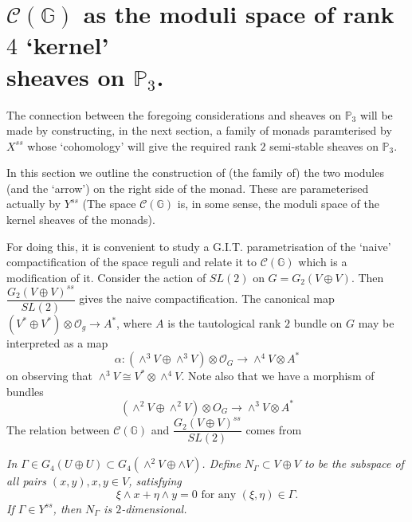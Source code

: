 \section[\texorpdfstring{$\mathscr{C}(\mathbb{G})$}{eq} as the moduli...]{\texorpdfstring{$\mathscr{C}(\mathbb{G})$}{eq} as the moduli space of rank \texorpdfstring{$4$}{eq}
  `kernel'\\ sheaves on \texorpdfstring{$\mathbb{P}_3$}{eq}.}\label{s6}

The connection between the foregoing considerations and sheaves\pageoriginale
 on
$\mathbb{P}_3$ will be made by constructing, in the next section, a family of monads paramterised by $X^{ss}$ whose `cohomology' will  give the required rank $2$ semi-stable sheaves on $\mathbb{P}_3$. 

In this section we outline the construction of (the family of) the two modules (and the `arrow') on the right side of the monad. These are parameterised actually by $Y^{ss}$ (The space $\mathscr{C}(\mathbb{G})$ is, in some sense, the moduli space of the kernel sheaves of the monads). 

For doing this, it is convenient to study a G.I.T. parametrisation of the `naive' compactification of the space reguli and relate it to $\mathscr{C}(\mathbb{G})$ which is a modification of it. Consider the action of $SL(2)$ on $G=G_2(V\oplus V)$. Then $\dfrac{G_2(V\oplus V)^{ss}}{SL(2)}$ gives the naive compactification. The canonical map $\left(V^{\ast}\oplus V^{\ast}\right)\otimes \mathscr{O}_g\to A^{\ast}$, where $A$ is the tautological rank $2$ bundle on $G$ may be interpreted as a map 
$$
\alpha:\left(\displaystyle\mathop{\wedge}^{3}V\oplus \displaystyle\mathop{\wedge}^{3}V\right)\otimes \mathscr{O}_G\to \displaystyle\mathop{\wedge}^{4} V\otimes A^{\ast}
$$
on observing that $\displaystyle\mathop{\wedge}^{3} V\cong V^{\ast}\otimes \displaystyle\mathop{\wedge}^{4} V$. Note also that we have a morphism of bundles 
$$
\left(\displaystyle\mathop{\wedge}^{2}V\oplus \displaystyle\mathop{\wedge}^{2}V\right)\otimes O_G\to \displaystyle\mathop{\wedge}^{3} V\otimes A^{\ast}
$$
The relation between $\mathscr{C}(\mathbb{G})$ and $\dfrac{G_2(V\oplus V)^{ss}}{SL(2)}$ comes from 
\begin{lem}
\textit{In $\Gamma \in G_4 (U\oplus U) \subset G_4\left(\displaystyle\mathop{\wedge}^{2} V\oplus \wedge V\right)$. Define $N_{\Gamma} \subset V\oplus V$\pageoriginale
 to be the subspace of all pairs $(x,y),x,y \in V$, satisfying }
$$
\xi \wedge x+\eta \wedge y=0 \text{ for any }  (\xi, \eta)\in \Gamma.
$$
\textit{If $\Gamma \in Y^{ss}$, then $N_{\Gamma}$ is $2$-dimensional.}
\end{lem}

